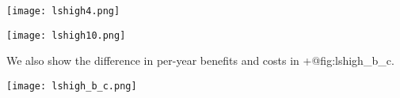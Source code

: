 \documentclass[
]{article}
\let\origfigure=\figure
\let\endorigfigure=\endfigure
\renewenvironment{figure}[1][]{%
    \origfigure[H]
}{%
    \endorigfigure
}
\begin{document}
\begin{figure}
\hypertarget{fig:lshigh4}{%
\centering
\texttt{[image: lshigh4.png]}
\caption{Lives Saved Alternative Specification Accumulated Benefits,
T=4}\label{fig:lshigh4}
}
\end{figure}

\begin{figure}
\hypertarget{fig:lshigh10}{%
\centering
\texttt{[image: lshigh10.png]}
\caption{Lives Saved Alternative Specification Accumulated Benefits,
T=10}\label{fig:lshigh10}
}
\end{figure}

We also show the difference in per-year benefits and costs in
+@fig:lshigh\_b\_c.

\begin{figure}
\hypertarget{fig:lshigh_b_c}{%
\centering
\texttt{[image: lshigh\_b\_c.png]}
\caption{Lives Saved (Alt. Definition) Per-Year Benefits and
Costs}\label{fig:lshigh_b_c}
}
\end{figure}
\end{document}
